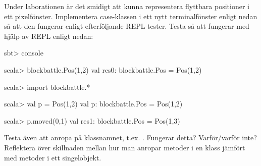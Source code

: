 \Subtask Under laborationen är det smidigt att kunna representera flyttbara positioner i ett pixelfönster. Implementera case-klassen  i ett nytt terminalfönster enligt nedan så att den fungerar enligt efterföljande REPL-tester.
Testa så att  fungerar med hjälp av REPL enligt nedan:
\begin{REPL}
sbt> console

scala> blockbattle.Pos(1,2)
val res0: blockbattle.Pos = Pos(1,2)

scala> import blockbattle.*

scala> val p = Pos(1,2)
val p: blockbattle.Pos = Pos(1,2)

scala> p.moved(0,1)
val res1: blockbattle.Pos = Pos(1,3)
\end{REPL}

Testa även att anropa  på klassnamnet, t.ex. . Fungerar detta? Varför/varför inte? Reflektera över skillnaden mellan hur man anropar metoder i en klass jämfört med metoder i ett singelobjekt.

